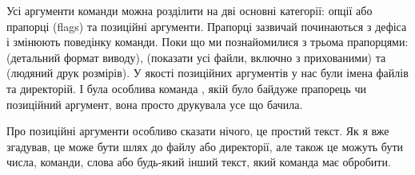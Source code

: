 \medskip

Усі аргументи команди можна розділити на дві основні категорії:
опції або прапорці (flags) та позиційні аргументи.
Прапорці зазвичай починаються з дефіса \chr{-} і змінюють поведінку команди.
Поки що ми познайомилися з трьома прапорцями:
 (детальний формат виводу),
 (показати усі файли, включно з прихованими)
та  (людяний друк розмірів).
У якості позиційних аргументів у нас були імена файлів та директорій.
І була особлива команда , якій було байдуже прапорець чи позиційний аргумент,
вона просто друкувала усе що бачила.

Про позиційні аргументи особливо сказати нічого, це простий текст.
Як я вже згадував, це може бути шлях до файлу або директорії,
але також це можуть бути числа, команди, слова або будь-який інший текст,
який команда має обробити.
